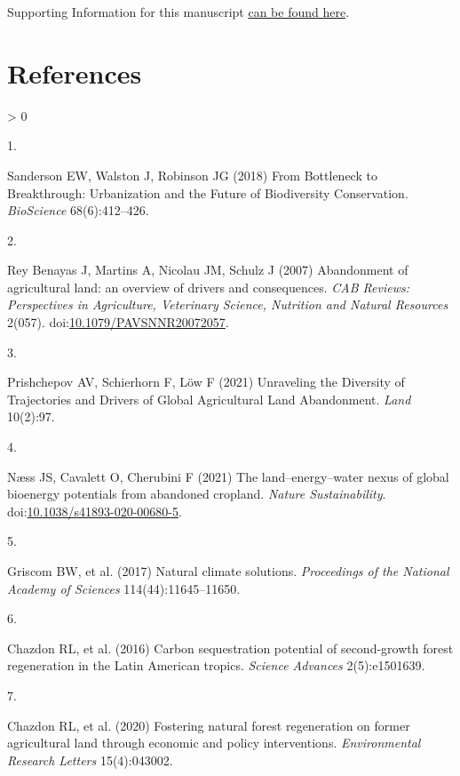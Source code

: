 \documentclass[9pt,twocolumn,twoside,lineno]{pnas-new}
\newlength{\csllabelwidth}
\newlength{\cslhangindent}
\newenvironment{CSLReferences}[2] %
 {%
  \setlength{\parindent}{0pt}
  \ifodd #1 \everypar{\setlength{\hangindent}{\cslhangindent}}\ignorespaces\fi
  \ifnum #2 > 0
  \setlength{\parskip}{#2\baselineskip}
  \fi
 }%
 {}
\newcommand{\CSLLeftMargin}[1]{\parbox[t]{\csllabelwidth}{#1}}
\newcommand{\CSLRightInline}[1]{\parbox[t]{\linewidth - \csllabelwidth}{#1}\break}
\begin{document}
Supporting Information for this manuscript \href{https://drive.google.com/file/d/1G5pzgpoEultZ69eiODsiBFrtd7NuLIUr/view?usp=sharing}{can be found here}.

\showacknow

\hypertarget{references}{%
\section*{References}\label{references}}

\hypertarget{refs}{}
\begin{CSLReferences}{0}{0}
\leavevmode\hypertarget{ref-Sanderson2018}{}%
\CSLLeftMargin{1. }
\CSLRightInline{Sanderson EW, Walston J, Robinson JG (2018) {From Bottleneck to Breakthrough: Urbanization and the Future of Biodiversity Conservation}. \emph{BioScience} 68(6):412--426.}

\leavevmode\hypertarget{ref-ReyBenayas2007}{}%
\CSLLeftMargin{2. }
\CSLRightInline{Rey Benayas J, Martins A, Nicolau JM, Schulz J (2007) {Abandonment of agricultural land: an overview of drivers and consequences.} \emph{CAB Reviews: Perspectives in Agriculture, Veterinary Science, Nutrition and Natural Resources} 2(057). doi:\href{https://doi.org/10.1079/PAVSNNR20072057}{10.1079/PAVSNNR20072057}.}

\leavevmode\hypertarget{ref-Prishchepov2021}{}%
\CSLLeftMargin{3. }
\CSLRightInline{Prishchepov AV, Schierhorn F, Löw F (2021) {Unraveling the Diversity of Trajectories and Drivers of Global Agricultural Land Abandonment}. \emph{Land} 10(2):97.}

\leavevmode\hypertarget{ref-Naess2021}{}%
\CSLLeftMargin{4. }
\CSLRightInline{Næss JS, Cavalett O, Cherubini F (2021) {The land--energy--water nexus of global bioenergy potentials from abandoned cropland}. \emph{Nature Sustainability}. doi:\href{https://doi.org/10.1038/s41893-020-00680-5}{10.1038/s41893-020-00680-5}.}

\leavevmode\hypertarget{ref-Griscom2017}{}%
\CSLLeftMargin{5. }
\CSLRightInline{Griscom BW, et al. (2017) {Natural climate solutions}. \emph{Proceedings of the National Academy of Sciences} 114(44):11645--11650.}

\leavevmode\hypertarget{ref-Chazdon2016a}{}%
\CSLLeftMargin{6. }
\CSLRightInline{Chazdon RL, et al. (2016) {Carbon sequestration potential of second-growth forest regeneration in the Latin American tropics}. \emph{Science Advances} 2(5):e1501639.}

\leavevmode\hypertarget{ref-Chazdon2020}{}%
\CSLLeftMargin{7. }
\CSLRightInline{Chazdon RL, et al. (2020) {Fostering natural forest regeneration on former agricultural land through economic and policy interventions}. \emph{Environmental Research Letters} 15(4):043002.}


\end{CSLReferences}
\end{document}
